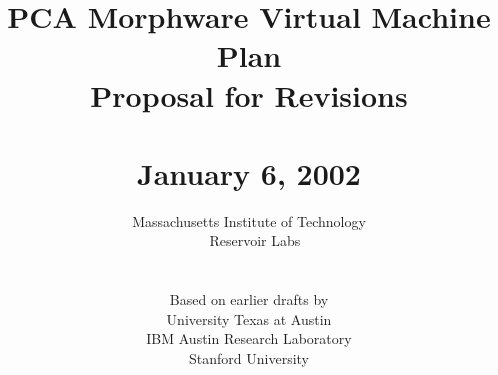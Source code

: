 \documentclass[10pt]{article}
\title{PCA Morphware Virtual Machine Plan \\ Proposal for Revisions \\ ~ \\ \Large{January 6, 2002}}
\date{}
\author{Massachusetts Institute of Technology \\ ~ Reservoir Labs \\ ~ \\ ~ \\ 
Based on earlier drafts by \\ University Texas at Austin \\ IBM Austin Research Laboratory \\ Stanford University}
\begin{document}
  \maketitle
  \newpage

  \newcommand{\mt}[1]{\mbox{\it #1}}
  \newcommand{\todo}[1]{\framebox{\bf #1}}
  \newcommand{\sss}[1]{\medskip \noindent {\bf #1} \smallskip}

  
  
  
  
  

%   
%    
  
\end{document}
